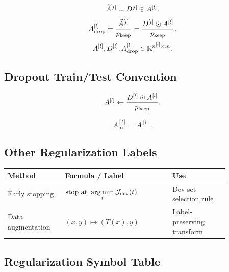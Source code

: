 \[
\widetilde{A}^{[l]}
=
D^{[l]} \odot A^{[l]}.
\]
\[
A_{\mathrm{drop}}^{[l]}
=
\frac{\widetilde{A}^{[l]}}{p_{\mathrm{keep}}}
=
\frac{D^{[l]} \odot A^{[l]}}{p_{\mathrm{keep}}}.
\]
\[
A^{[l]}, D^{[l]}, A_{\mathrm{drop}}^{[l]}
\in
\mathbb{R}^{n^{[l]} \times m}.
\]

\subsection{Dropout Train/Test Convention}

\[
A^{[l]}
\leftarrow
\frac{D^{[l]} \odot A^{[l]}}{p_{\mathrm{keep}}}.
\]

\[
A_{\mathrm{test}}^{[l]}
=
A^{[l]}.
\]

\subsection{Other Regularization Labels}

\begin{center}
\begin{tabular}{>{\raggedright\arraybackslash}p{0.22\linewidth}
                >{\raggedright\arraybackslash}p{0.42\linewidth}
                >{\raggedright\arraybackslash}p{0.22\linewidth}}
\toprule
Method & Formula / Label & Use \\
\midrule
Early stopping &
\(\displaystyle \text{stop at } \operatorname*{arg\,min}_t \mathcal{J}_{\mathrm{dev}}(t)\) &
Dev-set selection rule \\
\addlinespace
Data augmentation &
\(\displaystyle (x,y) \mapsto (T(x),y)\) &
Label-preserving transform \\
\bottomrule
\end{tabular}
\end{center}

\subsection{Regularization Symbol Table}

